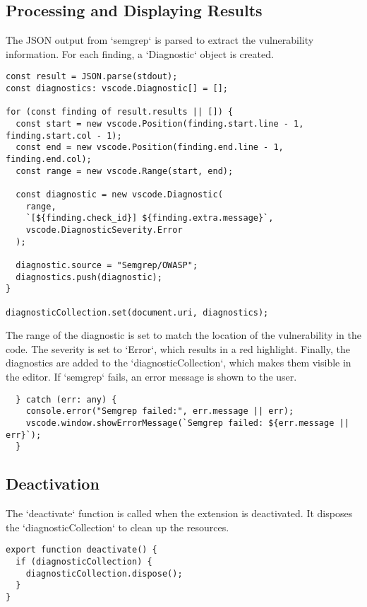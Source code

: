 \subsection{Processing and Displaying Results}

The JSON output from `semgrep` is parsed to extract the vulnerability information. For each finding, a `Diagnostic` object is created.

\begin{verbatim}
const result = JSON.parse(stdout);
const diagnostics: vscode.Diagnostic[] = [];

for (const finding of result.results || []) {
  const start = new vscode.Position(finding.start.line - 1, finding.start.col - 1);
  const end = new vscode.Position(finding.end.line - 1, finding.end.col);
  const range = new vscode.Range(start, end);

  const diagnostic = new vscode.Diagnostic(
    range,
    `[${finding.check_id}] ${finding.extra.message}`,
    vscode.DiagnosticSeverity.Error
  );

  diagnostic.source = "Semgrep/OWASP";
  diagnostics.push(diagnostic);
}

diagnosticCollection.set(document.uri, diagnostics);
\end{verbatim}

The range of the diagnostic is set to match the location of the vulnerability in the code. The severity is set to `Error`, which results in a red highlight. Finally, the diagnostics are added to the `diagnosticCollection`, which makes them visible in the editor. If `semgrep` fails, an error message is shown to the user.

\begin{verbatim}
  } catch (err: any) {
    console.error("Semgrep failed:", err.message || err);
    vscode.window.showErrorMessage(`Semgrep failed: ${err.message || err}`);
  }
\end{verbatim}

\subsection{Deactivation}

The `deactivate` function is called when the extension is deactivated. It disposes the `diagnosticCollection` to clean up the resources.

\begin{verbatim}
export function deactivate() {
  if (diagnosticCollection) {
    diagnosticCollection.dispose();
  }
}
\end{verbatim}